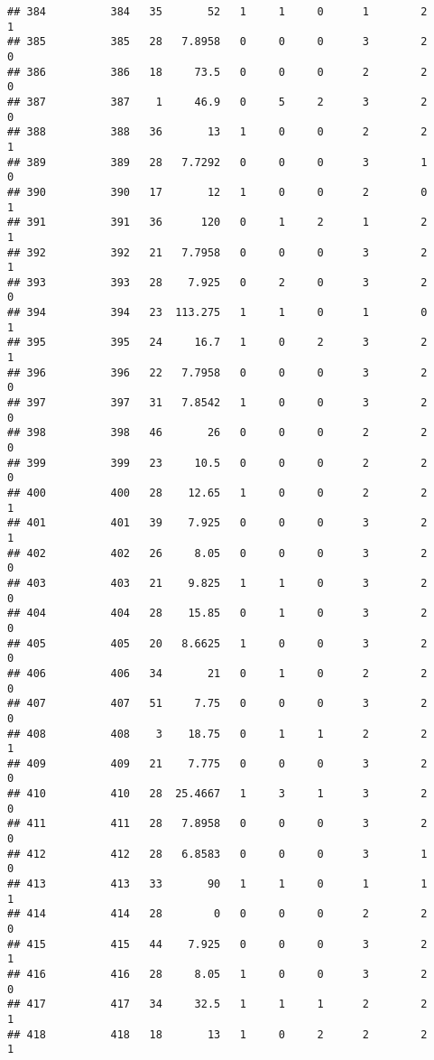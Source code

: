\documentclass[
]{article}
\begin{document}
\begin{verbatim}
## 384          384   35       52   1     1     0      1        2         1
## 385          385   28   7.8958   0     0     0      3        2         0
## 386          386   18     73.5   0     0     0      2        2         0
## 387          387    1     46.9   0     5     2      3        2         0
## 388          388   36       13   1     0     0      2        2         1
## 389          389   28   7.7292   0     0     0      3        1         0
## 390          390   17       12   1     0     0      2        0         1
## 391          391   36      120   0     1     2      1        2         1
## 392          392   21   7.7958   0     0     0      3        2         1
## 393          393   28    7.925   0     2     0      3        2         0
## 394          394   23  113.275   1     1     0      1        0         1
## 395          395   24     16.7   1     0     2      3        2         1
## 396          396   22   7.7958   0     0     0      3        2         0
## 397          397   31   7.8542   1     0     0      3        2         0
## 398          398   46       26   0     0     0      2        2         0
## 399          399   23     10.5   0     0     0      2        2         0
## 400          400   28    12.65   1     0     0      2        2         1
## 401          401   39    7.925   0     0     0      3        2         1
## 402          402   26     8.05   0     0     0      3        2         0
## 403          403   21    9.825   1     1     0      3        2         0
## 404          404   28    15.85   0     1     0      3        2         0
## 405          405   20   8.6625   1     0     0      3        2         0
## 406          406   34       21   0     1     0      2        2         0
## 407          407   51     7.75   0     0     0      3        2         0
## 408          408    3    18.75   0     1     1      2        2         1
## 409          409   21    7.775   0     0     0      3        2         0
## 410          410   28  25.4667   1     3     1      3        2         0
## 411          411   28   7.8958   0     0     0      3        2         0
## 412          412   28   6.8583   0     0     0      3        1         0
## 413          413   33       90   1     1     0      1        1         1
## 414          414   28        0   0     0     0      2        2         0
## 415          415   44    7.925   0     0     0      3        2         1
## 416          416   28     8.05   1     0     0      3        2         0
## 417          417   34     32.5   1     1     1      2        2         1
## 418          418   18       13   1     0     2      2        2         1

\end{verbatim}
\end{document}
